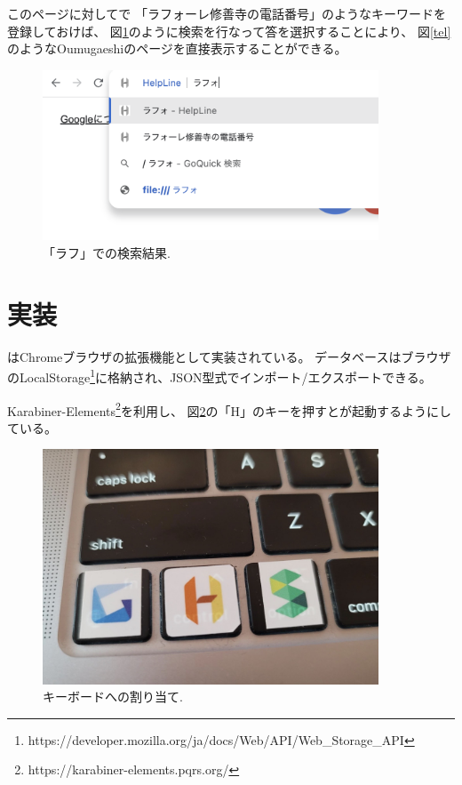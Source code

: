 \documentclass{ipsjprosym}
\begin{document}
このページに対して{\ds}で
「ラフォーレ修善寺の電話番号」のようなキーワードを登録しておけば、
図\ref{rafu}のように検索を行なって答を選択することにより、
図\ref{tel}のようなOumugaeshiのページを直接表示することができる。

\begin{figure}[h]
  \includegraphics[width=10cm,bb=0 0 1014 514]{figures/ea7daea727f0669fedbb7ebb6567b23c.png}
  \caption{「ラフ」での検索結果.}
  \label{rafu}
\end{figure}

\section{実装}

{\ds}はChromeブラウザの拡張機能として実装されている。
データベースはブラウザのLocalStorage\footnote{
  \textsf{https:{\slash}{\slash}developer.mozilla.org{\slash}ja{\slash}docs{\slash}Web{\slash}API{\slash}Web\_Storage\_API}
}に格納され、JSON型式でインポート/エクスポートできる。

Karabiner-Elements\footnote{
\textsf{https:{\slash}{\slash}karabiner-elements.pqrs.org{\slash}}
}を利用し、
図\ref{3keys}の「H」のキーを押すと{\ds}が起動するようにしている。

\begin{figure}[h]
  \includegraphics[width=10cm,bb=0 0 1446 1012]{figures/5a432cf5753e954ceb0069d0dbb5cde4.jpg}
  \caption{キーボードへの割り当て.}
  \label{3keys}
\end{figure}
\end{document}
